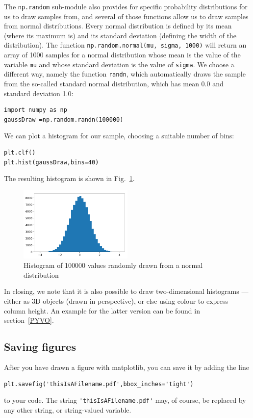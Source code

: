 \documentclass[twocolumn,apj]{openjournal}
\begin{document}
The \verb|np.random| sub-module also provides for specific probability distributions for us to draw samples from, and several of those functions allow us to draw samples from normal distributions. Every normal distribution is defined by its mean (where its maximum is) and its standard deviation (defining the width of the distribution). The function \verb|np.random.normal(mu, sigma, 1000)| will return an array of 1000 samples for a normal distribution whose mean is the value of the variable \verb|mu| and whose standard deviation is the value of \verb|sigma|. We choose a different way, namely the function \verb|randn|, which automatically draws the sample from the so-called standard normal distribution, which has mean 0.0 and standard deviation 1.0:
\begin{lstlisting}
import numpy as np
gaussDraw =np.random.randn(100000)
\end{lstlisting}
We can plot a histogram for our sample, choosing a suitable number of bins:
\begin{lstlisting}
plt.clf()
plt.hist(gaussDraw,bins=40)
\end{lstlisting}
The resulting histogram is shown in Fig.~\ref{GaussHisto}.
\begin{figure}[htbp]
\begin{center}
\includegraphics[width=0.5\textwidth]{gaussHisto.pdf}
\caption{Histogram of 100000 values randomly drawn from a normal distribution}
\label{GaussHisto}
\end{center}
\end{figure}
In closing, we note that it is also possible to draw two-dimensional histograms --- either as 3D objects (drawn in perspective), or else using colour to express column height. An example for the latter version can be found in section~\ref{PYVO}.

\subsection{Saving figures}

After you have drawn a figure with matplotlib, you can save it by adding the line
\begin{lstlisting}
plt.savefig('thisIsAFilename.pdf',bbox_inches='tight')
\end{lstlisting}
to your code. The string \verb|'thisIsAFilename.pdf'| may, of course, be replaced by any other string, or string-valued variable.
\end{document}
